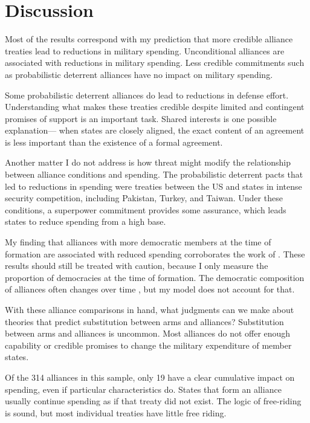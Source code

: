 \documentclass[12pt]{article}
\begin{document}
\section*{Discussion} 

Most of the results correspond with my prediction that more credible alliance treaties lead to reductions in military spending. Unconditional alliances are associated with reductions in military spending. Less credible commitments such as probabilistic deterrent alliances have no impact on military spending. 

Some probabilistic deterrent alliances do lead to reductions in defense effort. Understanding what makes these treaties credible despite limited and contingent promises of support is an important task. Shared interests is one possible explanation--- when states are closely aligned, the exact content of an agreement is less important than the existence of a formal agreement. 

Another matter I do not address is how threat might modify the relationship between alliance conditions and spending. The probabilistic deterrent pacts that led to reductions in spending were treaties between the US and states in intense security competition, including Pakistan, Turkey, and Taiwan. Under these conditions, a superpower commitment provides some assurance, which leads states to reduce spending from a high base. 

My finding that alliances with more democratic members at the time of formation are associated with reduced spending corroborates the work of \citet{DigiuseppePoast2016}. These results should still be treated with caution, because I only measure the proportion of democracies at the time of formation. The democratic composition of alliances often changes over time \citep{GiblerWolford2006}, but my model does not account for that. 

With these alliance comparisons in hand, what judgments can we make about theories that predict substitution between arms and alliances? Substitution between arms and alliances is uncommon. Most alliances do not offer enough capability or credible promises to change the military expenditure of member states. 

Of the 314 alliances in this sample, only 19 have a clear cumulative impact on spending, even if particular characteristics do. States that form an alliance usually continue spending as if that treaty did not exist. The logic of free-riding is sound, but most individual treaties have little free riding.
\end{document}
